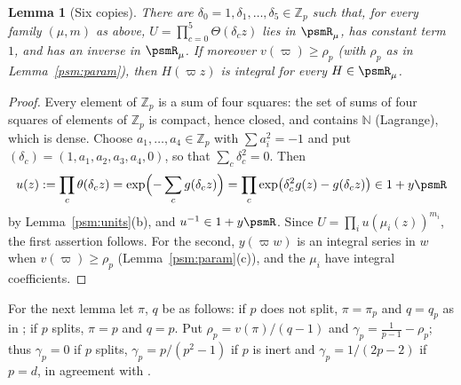 \documentclass[10pt]{amsart}
\newtheorem{lemma}[theorem]{Lemma}
\theoremstyle{definition}
\theoremstyle{remark}
\newcommand{\N}{\mathbb N}
\newcommand{\Z}{\mathbb Z}
\begin{document}
\begin{lemma}[Six copies]\label{psm:six}
There are $\delta_0=1,\delta_1,\dots,\delta_5\in\Z_p$ such that, for every family $(\mu,m)$ as above,
$U=\prod_{c=0}^5\Theta(\delta_cz)$ lies in $\psmR_\mu$, has constant term $1$, and has an inverse in
$\psmR_\mu$. If moreover $v(\varpi)\ge\rho_p$ \textup{(}with $\rho_p$ as in
Lemma~\ref{psm:param}\textup{)}, then $H(\varpi z)$ is integral for every $H\in\psmR_\mu$.
\end{lemma}
\begin{proof}
Every element of $\Z_p$ is a sum of four squares: the set of sums of four squares of elements of
$\Z_p$ is compact, hence closed, and contains $\N$ (Lagrange), which is dense. Choose
$a_1,\dots,a_4\in\Z_p$ with $\sum a_i^2=-1$ and put $(\delta_c)=(1,a_1,a_2,a_3,a_4,0)$, so that
$\sum_c\delta_c^2=0$. Then
\[
u(z):=\prod_c\theta(\delta_cz)=\exp\Bigl(-\sum_cg(\delta_cz)\Bigr)=\prod_c\exp\bigl(\delta_c^2g(z)
-g(\delta_cz)\bigr)\in1+y\psmR
\]
by Lemma~\ref{psm:units}(b), and $u^{-1}\in1+y\psmR$. Since $U=\prod_iu(\mu_i(z))^{m_i}$, the first
assertion follows. For the second, $y(\varpi w)$ is an integral series in $w$ when
$v(\varpi)\ge\rho_p$ (Lemma~\ref{psm:param}(c)), and the $\mu_i$ have integral coefficients.
\end{proof}

For the next lemma let $\pi$, $q$ be as follows: if $p$ does not split, $\pi=\pi_p$ and $q=q_p$ as
in {\cite[\S4.1]{P49}}; if $p$ splits, $\pi=p$ and $q=p$. Put $\rho_p=v(\pi)/(q-1)$ and
$\gamma_p=\frac1{p-1}-\rho_p$; thus $\gamma_p=0$ if $p$ splits, $\gamma_p=p/(p^2-1)$ if $p$ is
inert and $\gamma_p=1/(2p-2)$ if $p=d$, in agreement with {\cite[\S4.1]{P49}}.
\end{document}
